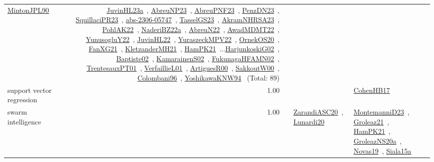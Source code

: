 {\begin{longtable}{p{3cm}r>{\raggedright\arraybackslash}p{6cm}>{\raggedright\arraybackslash}p{6cm}>{\raggedright\arraybackslash}p{8cm}}
\href{../works/MintonJPL90.pdf}{MintonJPL90}~\cite{MintonJPL90} & \href{../works/JuvinHL23a.pdf}{JuvinHL23a}~\cite{JuvinHL23a}, \href{../works/AbreuNP23.pdf}{AbreuNP23}~\cite{AbreuNP23}, \href{../works/AbreuPNF23.pdf}{AbreuPNF23}~\cite{AbreuPNF23}, \href{../works/PenzDN23.pdf}{PenzDN23}~\cite{PenzDN23}, \href{../works/SquillaciPR23.pdf}{SquillaciPR23}~\cite{SquillaciPR23}, \href{../works/abs-2306-05747.pdf}{abs-2306-05747}~\cite{abs-2306-05747}, \href{../works/TasselGS23.pdf}{TasselGS23}~\cite{TasselGS23}, \href{../works/AkramNHRSA23.pdf}{AkramNHRSA23}~\cite{AkramNHRSA23}, \href{../works/PohlAK22.pdf}{PohlAK22}~\cite{PohlAK22}, \href{../works/NaderiBZ22a.pdf}{NaderiBZ22a}~\cite{NaderiBZ22a}, \href{../works/AbreuN22.pdf}{AbreuN22}~\cite{AbreuN22}, \href{../works/AwadMDMT22.pdf}{AwadMDMT22}~\cite{AwadMDMT22}, \href{../works/YunusogluY22.pdf}{YunusogluY22}~\cite{YunusogluY22}, \href{../works/JuvinHL22.pdf}{JuvinHL22}~\cite{JuvinHL22}, \href{../works/YuraszeckMPV22.pdf}{YuraszeckMPV22}~\cite{YuraszeckMPV22}, \href{../works/OrnekOS20.pdf}{OrnekOS20}~\cite{OrnekOS20}, \href{../works/FanXG21.pdf}{FanXG21}~\cite{FanXG21}, \href{../works/KletzanderMH21.pdf}{KletzanderMH21}~\cite{KletzanderMH21}, \href{../works/HamPK21.pdf}{HamPK21}~\cite{HamPK21}...\href{../works/HarjunkoskiG02.pdf}{HarjunkoskiG02}~\cite{HarjunkoskiG02}, \href{../works/Baptiste02.pdf}{Baptiste02}~\cite{Baptiste02}, \href{../works/KamarainenS02.pdf}{KamarainenS02}~\cite{KamarainenS02}, \href{../works/FukunagaHFAMN02.pdf}{FukunagaHFAMN02}~\cite{FukunagaHFAMN02}, \href{../works/TrentesauxPT01.pdf}{TrentesauxPT01}~\cite{TrentesauxPT01}, \href{../works/VerfaillieL01.pdf}{VerfaillieL01}~\cite{VerfaillieL01}, \href{../works/ArtiguesR00.pdf}{ArtiguesR00}~\cite{ArtiguesR00}, \href{../works/SakkoutW00.pdf}{SakkoutW00}~\cite{SakkoutW00}, \href{../works/Colombani96.pdf}{Colombani96}~\cite{Colombani96}, \href{../works/YoshikawaKNW94.pdf}{YoshikawaKNW94}~\cite{YoshikawaKNW94} (Total: 89)\\
\index{support vector regression}\index{Algorithms!support vector regression}support vector regression &  1.00 &  &  & \href{../works/CohenHB17.pdf}{CohenHB17}~\cite{CohenHB17}\\
\index{swarm intelligence}\index{Algorithms!swarm intelligence}swarm intelligence &  1.00 &  & \href{../works/ZarandiASC20.pdf}{ZarandiASC20}~\cite{ZarandiASC20}, \href{../works/Lunardi20.pdf}{Lunardi20}~\cite{Lunardi20} & \href{../works/MontemanniD23.pdf}{MontemanniD23}~\cite{MontemanniD23}, \href{../works/Groleaz21.pdf}{Groleaz21}~\cite{Groleaz21}, \href{../works/HamPK21.pdf}{HamPK21}~\cite{HamPK21}, \href{../works/GroleazNS20a.pdf}{GroleazNS20a}~\cite{GroleazNS20a}, \href{../works/Novas19.pdf}{Novas19}~\cite{Novas19}, \href{../works/Siala15a.pdf}{Siala15a}~\cite{Siala15a}\\

\end{longtable}}
